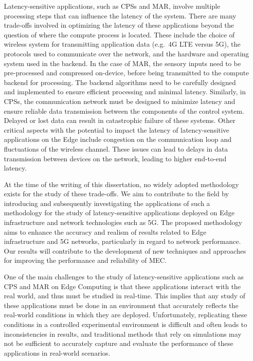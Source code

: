 Latency-sensitive applications, such as \glspl{CPS} and \gls{MAR}, involve multiple processing steps that can influence the latency of the system.
There are many trade-offs involved in optimizing the latency of these applications beyond the question of where the compute process is located. 
These include the choice of wireless system for transmitting application data (e.g.\ 4G \gls{LTE} versus 5G), the protocols used to communicate over the network, and the hardware and operating system used in the backend.
In the case of \gls{MAR}, the sensory inputs need to be pre-processed and compressed on-device, before being transmitted to the compute backend for processing.
The backend algorithms need to be carefully designed and implemented to ensure efficient processing and minimal latency. 
Similarly, in \glspl{CPS}, the communication network must be designed to minimize latency and ensure reliable data transmission between the components of the control system.
Delayed or lost data can result in catastrophic failure of these systems.
Other critical aspects with the potential to impact the latency of latency-sensitive applications on the Edge include congestion on the communication loop and fluctuations of the wireless channel.
These issues can lead to delays in data transmission between devices on the network, leading to higher end-to-end latency.

At the time of the writing of this dissertation, no widely adopted methodology exists for the study of these trade-offs.
We aim to contribute to the field by introducing and subsequently investigating the applications of such a methodology for the study of latency-sensitive applications deployed on Edge infrastructure and network technologies such as 5G.
The proposed methodology aims to enhance the accuracy and realism of results related to Edge infrastructure and 5G networks, particularly in regard to network performance.
Our results will contribute to the development of new techniques and approaches for improving the performance and reliability of \gls{MEC}.

One of the main challenges to the study of latency-sensitive applications such as \gls{CPS} and \gls{MAR} on Edge Computing is that these applications interact with the real world, and thus must be studied in real-time.
This implies that any study of these applications must be done in an environment that accurately reflects the real-world conditions in which they are deployed.
Unfortunately, replicating these conditions in a controlled experimental environment is difficult and often leads to inconsistencies in results, and traditional methods that rely on simulations may not be sufficient to accurately capture and evaluate the performance of these applications in real-world scenarios.

